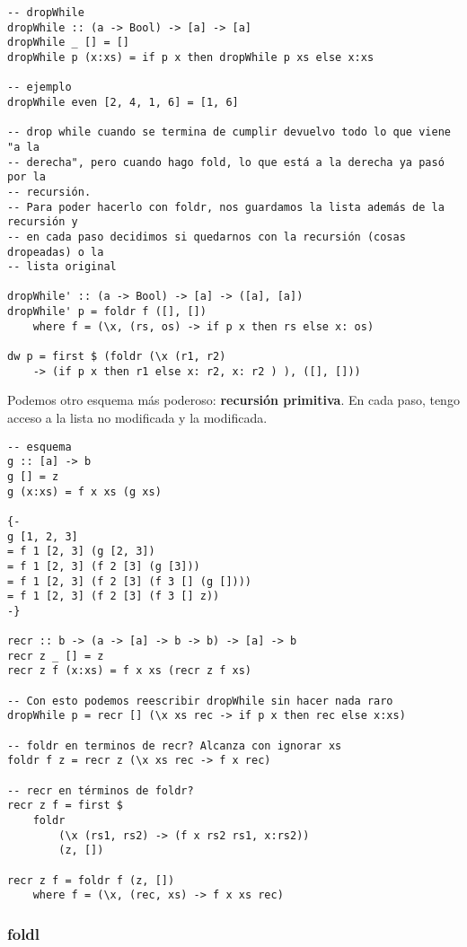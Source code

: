 \documentclass{report}
\theoremstyle{definition} %
\begin{document}
\begin{verbatim}
-- dropWhile
dropWhile :: (a -> Bool) -> [a] -> [a]
dropWhile _ [] = []
dropWhile p (x:xs) = if p x then dropWhile p xs else x:xs

-- ejemplo
dropWhile even [2, 4, 1, 6] = [1, 6]

-- drop while cuando se termina de cumplir devuelvo todo lo que viene "a la
-- derecha", pero cuando hago fold, lo que está a la derecha ya pasó por la
-- recursión.
-- Para poder hacerlo con foldr, nos guardamos la lista además de la recursión y
-- en cada paso decidimos si quedarnos con la recursión (cosas dropeadas) o la
-- lista original

dropWhile' :: (a -> Bool) -> [a] -> ([a], [a])
dropWhile' p = foldr f ([], [])
    where f = (\x, (rs, os) -> if p x then rs else x: os)

dw p = first $ (foldr (\x (r1, r2)
    -> (if p x then r1 else x: r2, x: r2 ) ), ([], []))

\end{verbatim}

Podemos otro esquema más poderoso: \textbf{recursión primitiva}. En cada paso,
tengo acceso a la lista no modificada y la modificada.

\begin{verbatim}
-- esquema
g :: [a] -> b
g [] = z
g (x:xs) = f x xs (g xs)

{-
g [1, 2, 3]
= f 1 [2, 3] (g [2, 3])
= f 1 [2, 3] (f 2 [3] (g [3]))
= f 1 [2, 3] (f 2 [3] (f 3 [] (g [])))
= f 1 [2, 3] (f 2 [3] (f 3 [] z))
-}

recr :: b -> (a -> [a] -> b -> b) -> [a] -> b
recr z _ [] = z
recr z f (x:xs) = f x xs (recr z f xs)

-- Con esto podemos reescribir dropWhile sin hacer nada raro
dropWhile p = recr [] (\x xs rec -> if p x then rec else x:xs)

-- foldr en terminos de recr? Alcanza con ignorar xs
foldr f z = recr z (\x xs rec -> f x rec)

-- recr en términos de foldr?
recr z f = first $
    foldr
        (\x (rs1, rs2) -> (f x rs2 rs1, x:rs2))
        (z, [])

recr z f = foldr f (z, [])
    where f = (\x, (rec, xs) -> f x xs rec)
\end{verbatim}

\subsubsection{foldl}
\end{document}

